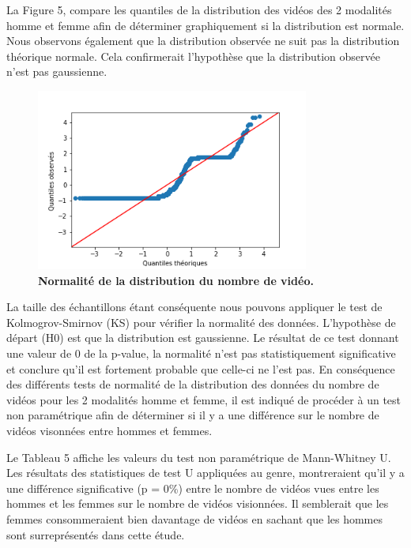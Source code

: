 \documentclass[12pt, a4paper, titlepage, table]{article}
\begin{document}
La Figure 5, compare les quantiles de la distribution des vidéos des 2 modalités homme et femme afin de déterminer graphiquement si la distribution est normale. Nous observons également que la distribution observée ne suit pas la distribution théorique normale. Cela confirmerait l'hypothèse que la distribution observée n'est pas gaussienne.


  	\begin{figure}[H]
  		\centering
  		\includegraphics[width=0.8\textwidth]{../../graph/distribution_video3.png}
  		\caption{\textbf{Normalité de la distribution du nombre de vidéo.}}
  	\end{figure}
  
La taille des échantillons étant conséquente nous pouvons appliquer le test de Kolmogrov-Smirnov (KS) pour vérifier la normalité des données. 
L'hypothèse de départ (H0) est que la distribution est gaussienne.
Le résultat de ce test donnant une valeur de 0 de la p-value, la normalité n'est pas statistiquement significative et conclure qu'il est fortement probable 
que celle-ci ne l'est pas.   
En conséquence des différents tests de normalité de la distribution des données du nombre de vidéos pour les 2 modalités homme et femme, il est indiqué
de procéder à un test non paramétrique afin de déterminer si il y a une différence sur le nombre de vidéos visonnées entre hommes et femmes. 

Le Tableau 5 affiche les valeurs du test non paramétrique de Mann-Whitney U. Les résultats des statistiques de test U appliquées au genre, montreraient 
qu'il y a une différence significative (p = 0\%) entre le nombre de vidéos vues entre les hommes et les femmes sur le nombre de vidéos visionnées. 
Il semblerait que les femmes consommeraient bien davantage de vidéos en sachant que les hommes sont surreprésentés dans cette étude. 
\end{document}
